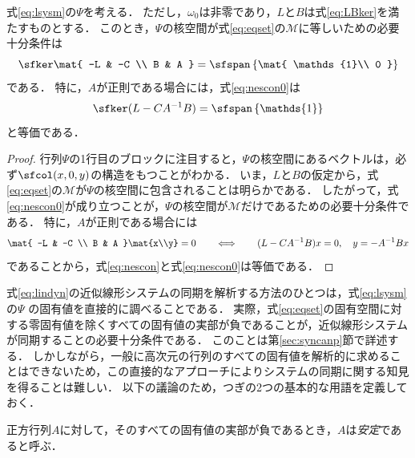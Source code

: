 \documentclass[a4j,10pt,oneside,openany,dvipdfmx]{jsbook}
\begin{document}
\begin{lemma}\label{lem:nescon}
式\eqref{eq:lsysm}の$\Psi$を考える．
ただし，$\omega_0$は非零であり，$L$と$B$は式\eqref{eq:LBker}を満たすものとする．
このとき，$\Psi$の核空間が式\eqref{eq:eqset}の$\mathcal{M}$に等しいための必要十分条件は
\begin{equation}\label{eq:nescon0}
\sfker \mat{
-L & -C \\
B & A
}
= \sfspan
\left\{
\mat{
\mathds{1}\\
0
}
\right\}
\end{equation}
である．
特に，$A$が正則である場合には，式\eqref{eq:nescon0}は
\begin{equation}\label{eq:nescon}
\sfker (L-CA^{-1}B) = \sfspan
\left\{
\mathds{1}
\right\}
\end{equation}
と等価である．
\end{lemma}

\begin{proof}
行列$\Psi$の1行目のブロックに注目すると，$\Psi$の核空間にあるベクトルは，必ず$\sfcol(x,0,y)$の構造をもつことがわかる．
いま，$L$と$B$の仮定から，式\eqref{eq:eqset}の$\mathcal{M}$が$\Psi$の核空間に包含されることは明らかである．
したがって，式\eqref{eq:nescon0}が成り立つことが，$\Psi$の核空間が$\mathcal{M}$だけであるための必要十分条件である．
特に，$A$が正則である場合には
\[
\mat{
-L & -C \\
B & A
}\mat{x\\y}
=0
\qquad
\Longleftrightarrow
\qquad
(L-CA^{-1}B)x=0,
\quad
y=-A^{-1}Bx
\]
であることから，式\eqref{eq:nescon}と式\eqref{eq:nescon0}は等価である．
\proofend
\end{proof}




式\eqref{eq:lindyn}の近似線形システムの同期を解析する方法のひとつは，式\eqref{eq:lsysm}の$\Psi$
の固有値を直接的に調べることである．
実際，式\eqref{eq:eqset}の固有空間に対する零固有値を除くすべての固有値の実部が負であることが，近似線形システムが同期することの必要十分条件である．
このことは第\ref{sec:syncanp}節で詳述する．
しかしながら，一般に高次元の行列のすべての固有値を解析的に求めることはできないため，この直接的なアプローチによりシステムの同期に関する知見を得ることは難しい．
以下の議論のため，つぎの2つの基本的な用語を定義しておく．

\begin{definition}\label{def:matsta}
正方行列$A$に対して，そのすべての固有値の実部が負であるとき，$A$は\emph{安定}であると呼ぶ．
\end{definition}
\end{document}
